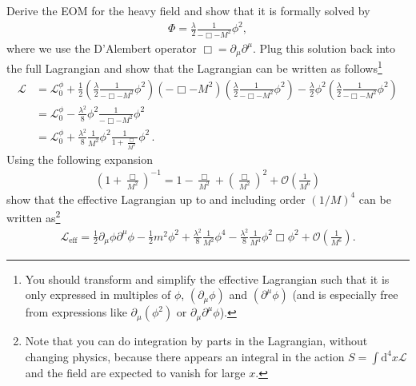 \documentclass[prd,%
,superscriptaddress,%
nofootinbib,%
tightenlines ]{revtex4}
\newcommand{\dd}{\mathrm{d}}
\renewcommand{\L}{\mathcal{L}}
\renewcommand{\O}{\mathcal{O}}
\renewcommand{\L}{\mathcal{L}}
\begin{document}
\begin{itemize}
Derive the EOM for the heavy field and show that it is formally solved by
\begin{gather}
\Phi=\frac{\lambda}{2}\frac{1}{-\Box -M^2}\phi^2,
\label{eq:formal_sol}
\end{gather}
where we use the D'Alembert operator $\Box=\partial_{\mu}\partial^{\mu}$.
Plug this solution back into the full Lagrangian and show that the Lagrangian can be written as follows\footnote{You should transform and simplify the effective Lagrangian such that it is only expressed in multiples of $\phi$, $(\partial_{\mu}\phi)$ and $(\partial^{\mu}\phi)$ 
(and is especially free from expressions like $\partial_{\mu}(\phi^2)$ or $\partial_{\mu}\partial^{\mu}\phi$).}
\begin{align}
\L&=\L_0^{\phi}
+\frac{1}{2}\left(\frac{\lambda}{2}\frac{1}{-\Box -M^2}\phi^2\right)
(-\Box-M^2)
\left(\frac{\lambda}{2}\frac{1}{-\Box -M^2}\phi^2\right)
-\frac{\lambda}{2}\phi^2 \left(\frac{\lambda}{2}\frac{1}{-\Box -M^2}\phi^2\right)
\\
&=\L_0^{\phi}-\frac{\lambda^2}{8}\phi^2 \frac{1}{-\Box -M^2}\phi^2
\\
&=\L_0^{\phi}+\frac{\lambda^2}{8}\frac{1}{M^2}\phi^2 \frac{1}{1+\frac{\Box}{M^2}}\phi^2
\,.
\end{align}
Using the following expansion
\begin{gather}
\left(1+\frac{\Box}{M^2}\right)^{-1}
=1-\frac{\Box}{M^2}+\left(\frac{\Box}{M^2}\right)^2
+\O\left(\frac{1}{M^6}\right)
\end{gather}
show that the effective Lagrangian up to and including order $(1/M)^4$ can be written as\footnote{Note that you can do integration by parts in the Lagrangian, without changing physics, because there appears an integral in the action $S=\int\dd^ 4 x \L$ and the field are expected to vanish for large $x$.}
\begin{gather}
\L_{\text{eff}}=
\frac{1}{2}\partial_{\mu}\phi\partial^{\mu}\phi
-\frac{1}{2}m^2\phi^2
+\frac{\lambda^2}{8}\frac{1}{M^2}\phi^4
-\frac{\lambda^2}{8}\frac{1}{M^4}\phi^2 \Box \phi^2
+\O\left(\frac{1}{M^6}\right).
\end{gather}


\end{itemize}
\end{document}
